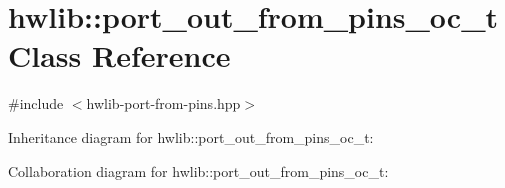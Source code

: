 \hypertarget{classhwlib_1_1port__out__from__pins__oc__t}{}\section{hwlib\+:\+:port\+\_\+out\+\_\+from\+\_\+pins\+\_\+oc\+\_\+t Class Reference}
\label{classhwlib_1_1port__out__from__pins__oc__t}


{\ttfamily \#include $<$hwlib-\/port-\/from-\/pins.\+hpp$>$}



Inheritance diagram for hwlib\+:\+:port\+\_\+out\+\_\+from\+\_\+pins\+\_\+oc\+\_\+t\+:


Collaboration diagram for hwlib\+:\+:port\+\_\+out\+\_\+from\+\_\+pins\+\_\+oc\+\_\+t\+:
